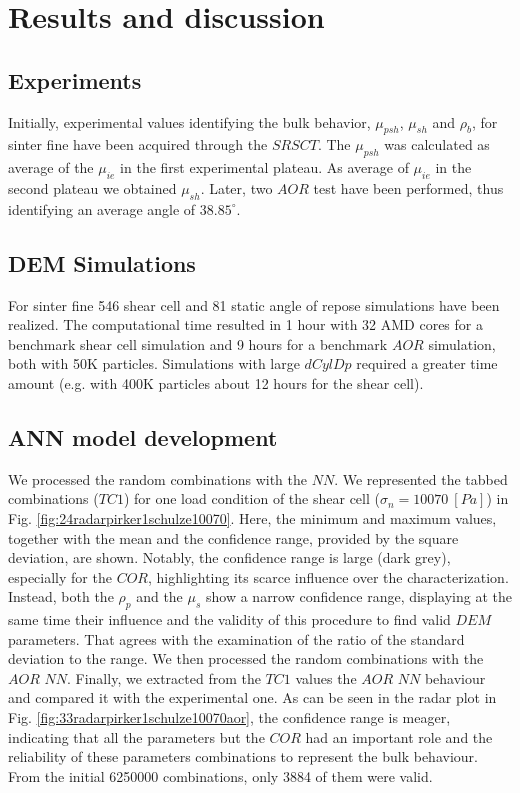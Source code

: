 \section{Results and discussion}
\label{sec:results}

\subsection{Experiments}
\label{subsec:experiments}

Initially, experimental values identifying the bulk behavior, $\mu_{psh}$, $\mu_{sh}$ and $\rho_{b}$, 
for sinter fine have been acquired through the $SRSCT$. 
The $\mu_{psh}$ was calculated as average of the $\mu_{ie}$ in the first
experimental plateau.
As average of $\mu_{ie}$ in the second plateau we obtained $\mu_{sh}$.
Later, two $AOR$ test have been performed, thus identifying an average angle of
$38.85 ^\circ$.

\subsection{DEM Simulations}
\label{subsec:simulations}

For sinter fine 546 shear cell and 81 static angle of repose simulations have
been realized.
The computational time resulted in 1 hour with 32 AMD cores for a benchmark
shear cell simulation and 9 hours for a benchmark $AOR$ simulation, both with 50K particles. 
Simulations with large $dCylDp$ required a greater time amount (e.g. with 400K
particles about 12 hours for the shear cell).

\subsection{ANN model development}
\label{subsec:annmodeldev}

We processed the random combinations with the $NN$.
We represented the tabbed combinations ($TC1$) for one load condition of the
shear cell ($\sigma_n=10070 ~[Pa]$) in Fig.
\ref{fig:24radarpirker1schulze10070}.
Here, the minimum and maximum values, together with the mean and the confidence
range, provided by the square deviation, are shown. 
Notably, the confidence range is large (dark grey), 
especially for the $COR$, highlighting its scarce influence over the characterization. 
Instead, both the $\rho_p$  and the $\mu_s$ show a narrow confidence range, 
displaying at the same time their influence and the validity of this procedure to find valid $DEM$ parameters. 
That agrees with the examination of the ratio of the standard deviation to the
range.
We then processed the random combinations with the $AOR$ $NN$. 
Finally, we extracted from the $TC1$ values the $AOR$ $NN$ behaviour
and compared it with the experimental one.
As can be seen in the radar plot in Fig.
\ref{fig:33radarpirker1schulze10070aor}, the confidence range is meager, indicating that all the parameters but the $COR$ 
had an important role and the reliability of these parameters combinations to represent the bulk behaviour. 
From the initial 6250000 combinations, only 3884 of them were valid.
